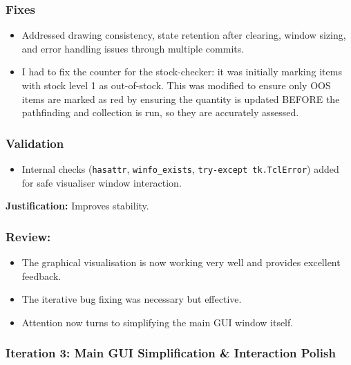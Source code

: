 \subsubsection{Fixes}
\begin{itemize}
	\item Addressed drawing consistency, state retention after clearing, window sizing, and error handling issues through multiple commits.
	
	\item I had to fix the counter for the stock-checker: it was initially marking items with stock level 1 as out-of-stock. This was modified to ensure only OOS items are marked as red by ensuring the quantity is updated BEFORE the pathfinding and collection is run, so they are accurately assessed.
\end{itemize}

\subsubsection{Validation}
\begin{itemize}
	\item Internal checks (\verb|hasattr|, \verb|winfo_exists|, \verb|try-except tk.TclError|) added for safe visualiser window interaction.
\end{itemize}
\textbf{Justification:} Improves stability.

\subsubsection{Review:}
\begin{itemize}
	\item The graphical visualisation is now working very well and provides excellent feedback.
	\item The iterative bug fixing was necessary but effective.
	\item Attention now turns to simplifying the main GUI window itself.
\end{itemize}

\newpage

\subsubsection{Iteration 3: Main GUI Simplification \& Interaction Polish}


